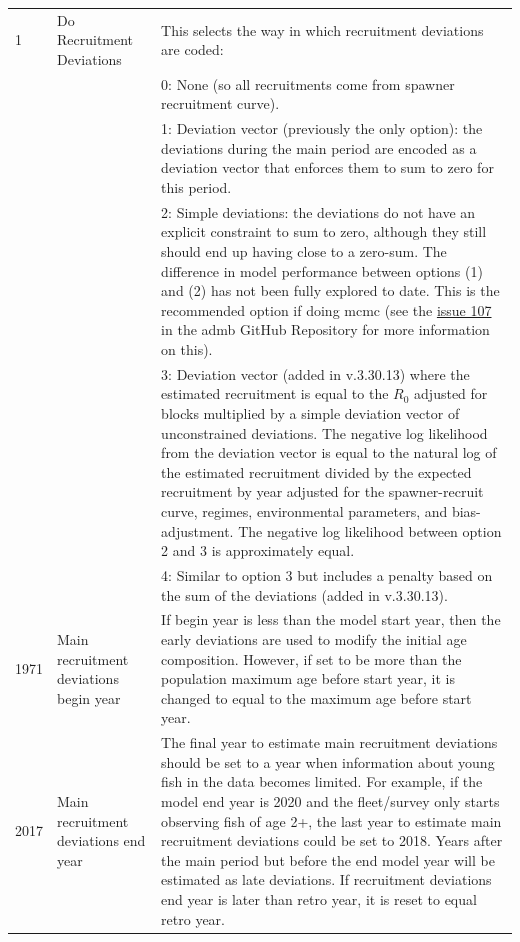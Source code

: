 \begin{longtable}{p{1cm} p{3cm} p{12cm}}
	1 \Tstrut & Do Recruitment Deviations & This selects the way in which recruitment deviations are coded: \\
	  & & 0: None (so all recruitments come from spawner recruitment curve). \\
	  & & 1: Deviation vector (previously the only option): the deviations during the main period are encoded as a deviation vector that enforces them to sum to zero for this period. \\
	  & & 2: Simple deviations: the deviations do not have an explicit constraint to sum to zero, although they still should end up having close to a zero-sum. The difference in model performance between options (1) and (2) has not been fully explored to date. This is the recommended option if doing \gls{mcmc} (see the \href{https://github.com/admb-project/admb/issues/107}{issue 107} in the \gls{admb} GitHub Repository for more information on this). \\
	  & & 3: Deviation vector (added in v.3.30.13) where the estimated recruitment is equal to the $R_{0}$ adjusted for blocks multiplied by a simple deviation vector of unconstrained deviations. The negative log likelihood from the deviation vector is equal to the natural log of the estimated recruitment divided by the expected recruitment by year adjusted for the spawner-recruit curve, regimes, environmental parameters, and bias-adjustment. The negative log likelihood between option 2 and 3 is approximately equal. \\
	  & & 4: Similar to option 3 but includes a penalty based on the sum of the deviations (added in v.3.30.13). \\
	\hline

	1971 \Tstrut & Main recruitment deviations begin year & If begin year is less than the model start year, then the early deviations are used to modify the initial age composition. However, if set to be more than the population maximum age before start year, it is changed to equal to the maximum age before start year. \Bstrut\\
	\hline

	2017 \Tstrut & \hypertarget{RecDevEndYear}{Main recruitment deviations end year} & The final year to estimate main recruitment deviations should be set to a year when information about young fish in the data becomes limited. For example, if the model end year is 2020 and the fleet/survey only starts observing fish of age 2+, the last year to estimate main recruitment deviations could be set to 2018. Years after the main period but before the end model year will be estimated as late deviations. If recruitment deviations end year is later than retro year, it is reset to equal retro year. \Bstrut\\
	\hline


\end{longtable}
